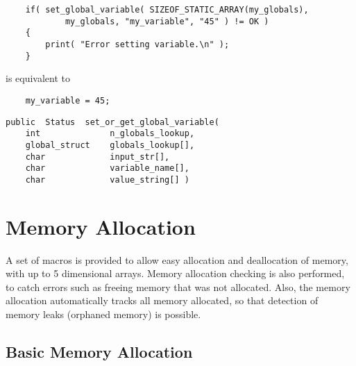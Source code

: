 {\bf\begin{verbatim}
    if( set_global_variable( SIZEOF_STATIC_ARRAY(my_globals),
            my_globals, "my_variable", "45" ) != OK )
    {
        print( "Error setting variable.\n" );
    }
\end{verbatim}}
is equivalent to
{\bf\begin{verbatim}
    my_variable = 45;
\end{verbatim}}

{\bf\begin{verbatim}
public  Status  set_or_get_global_variable(
    int              n_globals_lookup,
    global_struct    globals_lookup[],
    char             input_str[],
    char             variable_name[],
    char             value_string[] )
\end{verbatim}}


\section{Memory Allocation}

A set of macros is provided to allow easy allocation and deallocation
of memory, with up to 5 dimensional arrays.  Memory allocation
checking is also performed, to catch errors such as freeing memory
that was not allocated.  Also, the memory allocation automatically
tracks all memory allocated, so that detection of memory leaks
(orphaned memory) is possible.

\subsection{Basic Memory Allocation}

